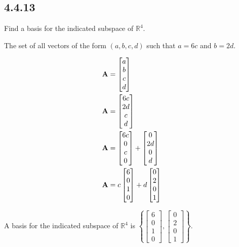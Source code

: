 \documentclass{article}
\begin{document}
\subsection{4.4.13}

Find a basis for the indicated subspace of $ \mathbb{R}^4 $.

The set of all vectors of the form $ (a, b, c, d) $ such that $ a = 6c $ and $ b = 2d $.

\begin{align*}
	\mathbf{A} & = \begin{bmatrix} a \\ b \\ c \\ d \end{bmatrix} \\
	\mathbf{A} & = \begin{bmatrix} 6c \\ 2d \\ c \\ d \end{bmatrix} \\
	\mathbf{A} & =
	\begin{bmatrix} 6c \\ 0 \\ c \\ 0 \end{bmatrix}
	+ \begin{bmatrix} 0 \\ 2d \\ 0 \\ d \end{bmatrix} \\
	\mathbf{A} & =
		c \begin{bmatrix} 6 \\ 0 \\ 1 \\ 0 \end{bmatrix}
		+ d \begin{bmatrix} 0 \\ 2 \\ 0 \\ 1 \end{bmatrix}
\end{align*}
\begin{mdframed}
	A basis for the indicated subspace of $ \mathbb{R}^4 $ is $ \left\{ \begin{bmatrix} 6 \\ 0 \\ 1 \\ 0 \end{bmatrix}, \begin{bmatrix} 0 \\ 2 \\ 0 \\ 1 \end{bmatrix} \right\} $.
\end{mdframed}
\end{document}
